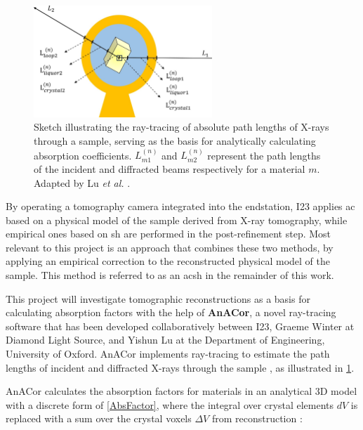\begin{figure}
    \centering
    \includegraphics[width = 0.6\textwidth]{images/absorption correction diagram.jpg}
    \caption{Sketch illustrating the ray-tracing of absolute path lengths of X-rays through a sample, serving as the basis for analytically calculating absorption coefficients. $L_{m1}^{(n)}$ and $L_{m2}^{(n)}$ represent the path lengths of the incident and diffracted beams respectively for a material $m$. Adapted by Lu \textit{et al.} \cite{Lu}.
    }
    \label{fig:analytical correction model}
\end{figure}

By operating a tomography camera integrated into the endstation, I23 applies \ac{ac} based on a physical model of the sample derived from X-ray tomography, while empirical ones based on \ac{sh} are performed in the post-refinement step. Most relevant to this project is an approach that combines these two methods, by applying an empirical correction to the reconstructed physical model of the sample. This method is referred to as an \ac{acsh} in the remainder of this work. %

This project will investigate tomographic reconstructions as a basis for calculating absorption factors with the help of \textbf{AnACor}, a novel ray-tracing software that has been developed collaboratively between I23, Graeme Winter at Diamond Light Source, and Yishun Lu at the Department of Engineering, University of Oxford. AnACor implements ray-tracing to estimate the path lengths of incident and diffracted X-rays through the sample \cite{Lu}, as illustrated in \cref{fig:analytical correction model}.

AnACor calculates the absorption factors for materials in an analytical 3D model with a discrete form of \cref{AbsFactor}, where the integral over crystal elements $dV$ is replaced with a sum over the crystal voxels $\Delta V$ from  reconstruction \cite{Lu}: %

